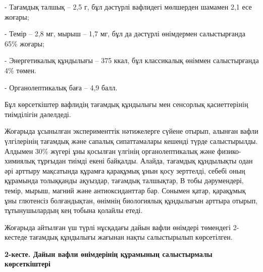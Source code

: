 - Тағамдық талшық -- 2,5 г, бұл дәстүрлі вафлидегі мөлшерден шамамен 2,1
есе жоғары;

- Темір -- 2,8 мг, мырыш -- 1,7 мг, бұл да дәстүрлі өнімдермен
салыстырғанда 65\% жоғары;

- Энергетикалық құндылығы -- 375 ккал, бұл классикалық өніммен
салыстырғанда 4\% төмен.

- Органолептикалық баға -- 4,9 балл.

Бұл көрсеткіштер вафлидің тағамдық құндылығы мен сенсорлық қасиеттерінің
тиімділігін дәлелдеді.

Жоғарыда ұсынылған эксперименттік нәтижелерге сүйене отырып, алынған
вафли үлгілерінің тағамдық және сапалық сипаттамалары кешенді түрде
салыстырылды. Алдымен 30\% жүгері ұны қосылған үлгінің органолептикалық
және физико-химиялық тұрғыдан тиімді екені байқалды. Алайда, тағамдық
құндылықты одан әрі арттыру мақсатында құрамға қарақұмық ұнын қосу
зерттелді, себебі оның құрамында толыққанды ақуыздар, тағамдық
талшықтар, В тобы дәрумендері, темір, мырыш, магний және антиоксиданттар
бар. Сонымен қатар, қарақұмық ұны глютенсіз болғандықтан, өнімнің
биологиялық құндылығын арттыра отырып, тұтынушылардың кең тобына қолайлы
етеді.

Жоғарыда айтылған үш түрлі нұсқадағы дайын вафли өнімдері төмендегі
2-кестеде тағамдық құндылығы жағынан нақты салыстырылып көрсетілген.

{\bfseries 2-кесте. Дайын вафли өнімдерінің құрамының салыстырмалы
көрсеткіштері}

